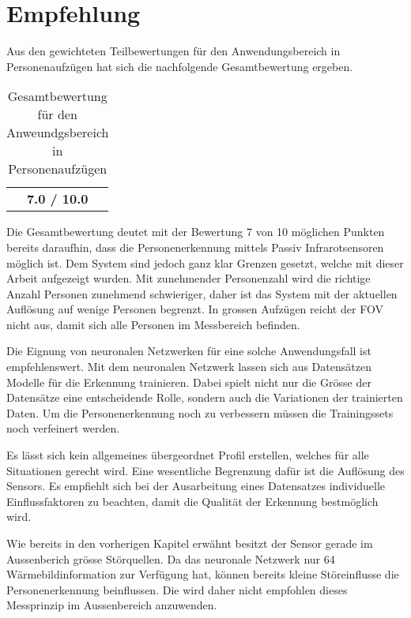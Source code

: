  \newpage

\section{Empfehlung}
\label{sec:Empfehlung}

Aus den gewichteten Teilbewertungen für den Anwendungsbereich in Personenaufzügen hat sich die nachfolgende Gesamtbewertung ergeben.

\begin{table}[H]
	\centering
	\caption{Gesamtbewertung für den Anweundgsbereich in Personenaufzügen}
	\label{tab:Gesamtbewertung}
	\begin{tabular}{|c|}
		\hline
		\rowcolor[HTML]{9B9B9B} 
		\multicolumn{1}{|c|}{\cellcolor[HTML]{9B9B9B}\textbf{Gesamtbewertung}} \\ \hline
		\textbf{7.0 / 10.0 }                                                                   \\ \hline
	\end{tabular}
\end{table} 

Die Gesamtbewertung deutet mit der Bewertung 7 von 10 möglichen Punkten bereits daraufhin, dass die Personenerkennung mittels Passiv Infrarotsensoren möglich ist. Dem System sind jedoch ganz klar Grenzen gesetzt, welche mit dieser Arbeit aufgezeigt wurden. Mit zunehmender Personenzahl wird die richtige Anzahl Personen zunehmend schwieriger, daher ist das System mit der aktuellen Auflösung auf wenige Personen begrenzt. In grossen Aufzügen reicht der \ac{FOV} nicht aus, damit sich alle Personen im Messbereich befinden.

Die Eignung von neuronalen Netzwerken für eine solche Anwendungsfall ist empfehlenswert. Mit dem neuronalen Netzwerk lassen sich aus Datensätzen Modelle für die Erkennung trainieren. Dabei spielt nicht nur die Grösse der Datensätze eine entscheidende Rolle, sondern auch die Variationen der trainierten Daten. Um die Personenerkennung noch zu verbessern müssen die Trainingssets noch verfeinert werden. 

Es lässt sich kein allgemeines übergeordnet Profil erstellen, welches für alle Situationen gerecht wird. Eine wesentliche Begrenzung dafür ist die Auflösung des Sensors. Es empfiehlt sich bei der Ausarbeitung eines Datensatzes individuelle Einflussfaktoren zu beachten, damit die Qualität der Erkennung bestmöglich wird. 

Wie bereits in den vorherigen Kapitel erwähnt besitzt der Sensor gerade im Aussenberich grösse Störquellen. Da das neuronale Netzwerk nur 64 Wärmebildinformation zur Verfügung hat, können bereits kleine Störeinflusse die Personenerkennung beinflussen. Die wird daher nicht empfohlen dieses Messprinzip im Aussenbereich anzuwenden.

